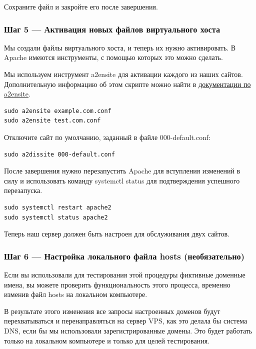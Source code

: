 \documentclass[14pt, a4paper]{article}
\begin{document}
Сохраните файл и закройте его после завершения.

\subsubsection*{Шаг 5 — Активация новых файлов виртуального хоста}

Мы создали файлы виртуального хоста, и теперь их нужно активировать. В Apache имеются инструменты, 
с помощью которых это можно сделать.

Мы используем инструмент a2ensite для активации каждого из наших сайтов. Дополнительную информацию об 
этом скрипте можно найти в \href{https://manpages.debian.org/jessie/apache2/a2ensite.8.en.html}{документации по a2ensite}.

\begin{lstlisting}
sudo a2ensite example.com.conf
sudo a2ensite test.com.conf
\end{lstlisting}

Отключите сайт по умолчанию, заданный в файле 000-default.conf:

\begin{lstlisting}
sudo a2dissite 000-default.conf
\end{lstlisting}

После завершения нужно перезапустить Apache для вступления изменений в силу и использовать 
команду systemctl status для подтверждения успешного перезапуска.

\begin{lstlisting}
sudo systemctl restart apache2
sudo systemctl status apache2
\end{lstlisting}

Теперь наш сервер должен быть настроен для обслуживания двух сайтов.

\subsubsection*{Шаг 6 — Настройка локального файла hosts (необязательно)}

Если вы использовали для тестирования этой процедуры фиктивные доменные имена, вы можете проверить 
функциональность этого процесса, временно изменив файл hosts на локальном компьютере.

В результате этого изменения все запросы настроенных доменов будут перехватываться и перенаправляться на сервер 
VPS, как это делала бы система DNS, если бы мы использовали зарегистрированные домены. Это будет работать 
только на локальном компьютере и только для целей тестирования.
\end{document}
